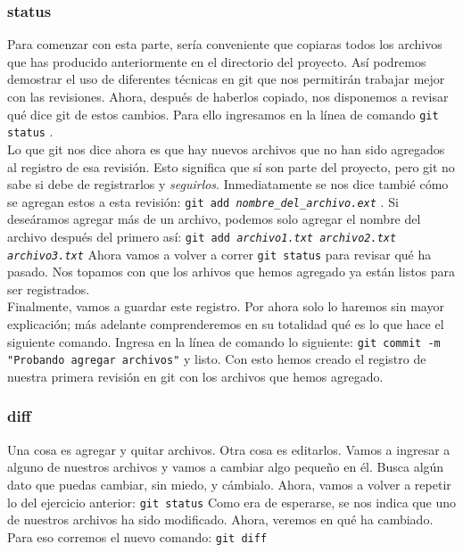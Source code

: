 \documentclass[10pt,letterpaper]{article}
\newcommand{\inlinecode}[1]{
\colorbox{light-gray}{\texttt{#1}}
}
\begin{document}
\subsubsection{status}
Para comenzar con esta parte, ser\'ia conveniente que copiaras todos los archivos que has producido anteriormente en el directorio del proyecto. As\'i podremos demostrar el uso de diferentes t\'ecnicas en git que nos permitir\'an trabajar mejor con las revisiones. Ahora, despu\'es de haberlos copiado, nos disponemos a revisar qu\'e dice git de estos cambios. Para ello ingresamos en la l\'inea de comando \inlinecode{git status}.\\

Lo que git nos dice ahora es que hay nuevos archivos que no han sido agregados al registro de esa revisi\'on. Esto significa que s\'i son parte del proyecto, pero git no sabe si debe de registrarlos y \emph{seguirlos}. Inmediatamente se nos dice tambi\'e c\'omo se agregan estos a esta revisi\'on: \inlinecode{git add \emph{nombre\_del\_archivo.ext}}. Si dese\'aramos agregar m\'as de un archivo, podemos solo agregar el nombre del archivo despu\'es del primero as\'i: \inlinecode{git add \emph{archivo1.txt} \emph{archivo2.txt} \emph{archivo3.txt}} Ahora vamos a volver a correr \inlinecode{git status} para revisar qu\'e ha pasado. Nos topamos con que los arhivos que hemos agregado ya est\'an listos para ser registrados.\\

Finalmente, vamos a guardar este registro. Por ahora solo lo haremos sin mayor explicaci\'on; m\'as adelante comprenderemos en su totalidad qu\'e es lo que hace el siguiente comando. Ingresa en la l\'inea de comando lo siguiente: \inlinecode{git commit -m "Probando agregar archivos"} y listo. Con esto hemos creado el registro de nuestra primera revisi\'on en git con los archivos que hemos agregado.

\subsubsection{diff}
Una cosa es agregar y quitar archivos. Otra cosa es editarlos. Vamos a ingresar a alguno de nuestros archivos y vamos a cambiar algo peque\~no en \'el. Busca alg\'un dato que puedas cambiar, sin miedo, y c\'ambialo. Ahora, vamos a volver a repetir lo del ejercicio anterior: \inlinecode{git status} Como era de esperarse, se nos indica que uno de nuestros archivos ha sido modificado. Ahora, veremos en qu\'e ha cambiado. Para eso corremos el nuevo comando: \inlinecode{git diff}\\
\end{document}
